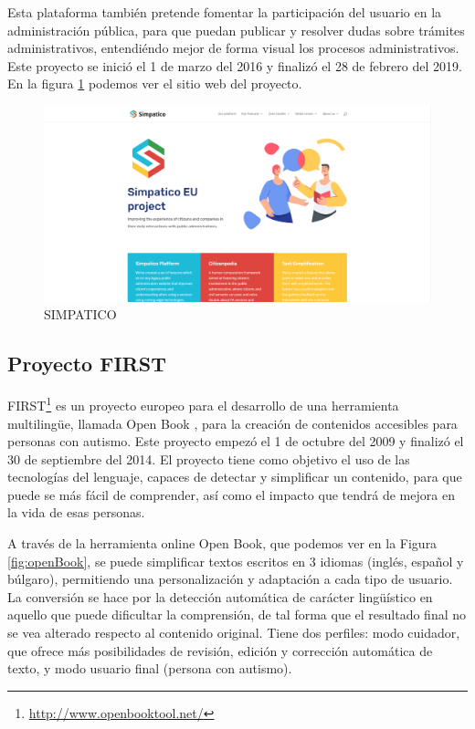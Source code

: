 Esta plataforma también pretende fomentar la participación del usuario en la administración pública, para que puedan publicar y resolver dudas sobre trámites administrativos, entendiéndo mejor de forma visual los procesos administrativos. Este proyecto se inició el 1 de marzo del 2016 y finalizó el 28 de febrero del 2019. En la figura \ref{fig:simpatico} podemos ver el sitio web del proyecto.


\begin{figure}[h]
	\centering
	\includegraphics[width=1.0\textwidth]{Imagenes/ProyectosMateriales/simpatico}
	\caption{SIMPATICO}
	\label{fig:simpatico}
\end{figure} 




\subsection{Proyecto FIRST}

FIRST\footnote{\href{http://www.openbooktool.net/}{http://www.openbooktool.net/}} es un proyecto europeo para el desarrollo de una herramienta multilingüe, llamada Open Book \citep{openBook}, para la creación de contenidos accesibles para personas con autismo. Este proyecto empezó el 1 de octubre del 2009 y finalizó el 30 de septiembre del 2014.
El proyecto tiene como objetivo el uso de las tecnologías del lenguaje, capaces de detectar y simplificar un contenido, para que puede se más fácil de comprender, así como el impacto que tendrá de mejora en la vida de esas personas. 

A través de la herramienta online Open Book, que podemos ver en la Figura \ref{fig:openBook}, se puede simplificar textos escritos en 3 idiomas (inglés, español y búlgaro), permitiendo una personalización y adaptación a cada tipo de usuario. La conversión se hace por la detección automática de carácter lingüístico en aquello que puede dificultar la comprensión, de tal forma que el resultado final no se vea alterado respecto al contenido original. Tiene dos perfiles: modo cuidador, que ofrece más posibilidades de revisión, edición y corrección automática de texto, y modo usuario final (persona con autismo). 


